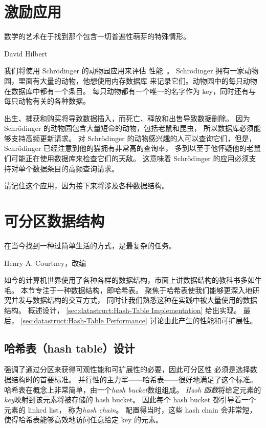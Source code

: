 \section{激励应用}
\label{sec:datastruct:Motivating Application}
%
\epigraph{数学的艺术在于找到那个包含一切普遍性萌芽的特殊情形。}
	 {David Hilbert}

我们将使用 Schr\"odinger 的动物园应用来评估
性能~\cite{McKenney:2013:SDS:2483852.2483867}。
Schr\"odinger 拥有一家动物园，里面有大量的动物，他想使用内存数据库
来记录它们。动物园中的每只动物在数据库中都有一个条目。
每只动物都有一个唯一的名字作为 key，同时还有与每只动物有关的各种数据。

出生、捕获和购买将导致数据插入，而死亡、释放和出售导致数据删除。
因为 Schr\"odinger 的动物园包含大量短命的动物，包括老鼠和昆虫，
所以数据库必须能够支持高频更新请求。
对 Schr\"odinger 的动物感兴趣的人可以查询它们，但是，
Schr\"odinger 已经注意到他的猫拥有非常高的查询率，
多到以至于他怀疑他的老鼠们可能正在使用数据库来检查它们的天敌。
这意味着 Schr\"odinger 的应用必须支持对单个数据条目的高频查询请求。

请记住这个应用，因为接下来将涉及各种数据结构。

\section{可分区数据结构}
\label{sec:datastruct:Partitionable Data Structures}
%
\epigraph{在当今找到一种过简单生活的方式，是最复杂的任务。}
	 {Henry A. Courtney，改编}

如今的计算机世界使用了各种各样的数据结构，市面上讲数据结构的教科书多如牛毛。
本节专注于一种数据结构，即哈希表。
聚焦于哈希表使我们能够更深入地研究并发与数据结构的交互方式，
同时让我们熟悉这种在实践中被大量使用的数据结构。
概述设计，
\cref{sec:datastruct:Hash-Table Implementation}
给出实现。
最后，
\cref{sec:datastruct:Hash-Table Performance}
讨论由此产生的性能和可扩展性。

\subsection{哈希表（hash table）设计}
\label{sec:datastruct:Hash-Table Design}

强调了通过分区来获得可观性能和可扩展性的必要，因此可分区性
必须是选择数据结构时的首要标准。
并行性的主力军——哈希表——很好地满足了这个标准。
哈希表在概念上非常简单，由一个\emph{hash bucket}数组组成。
\emph{Hash 函数}将给定元素的\emph{key}映射到该元素将被存储的 hash bucket。
因此每个 hash bucket 都引导着一个元素的 linked list，
称为\emph{hash chain}。
配置得当时，这些 hash chain 会非常短，
使得哈希表能够高效地访问任意给定 key 的元素。

